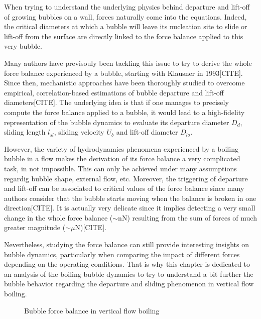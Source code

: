 When trying to understand the underlying physics behind departure and lift-off of growing bubbles on a wall, forces naturally come into the equations. Indeed, the critical diameters at which a bubble will leave its nucleation site to slide or lift-off from the surface are directly linked to the force balance applied to this very bubble.

\npar

Many authors have previsouly been tackling this issue to try to derive the whole force balance experienced by a bubble, starting with Klausner in 1993[CITE]. Since then, mechanistic approaches have been thoroughly studied to overcome empirical, correlation-based estimations of bubble departure and lift-off diameters[CITE]. The underlying idea is that if one manages to precisely compute the force balance applied to a bubble, it would lead to a high-fidelity representation of the bubble dynamics to evaluate its departure diameter $D_{d}$, sliding length $l_{sl}$, sliding velocity $U_{b}$ and lift-off diameter $D_{lo}$.  

\npar

However, the variety of hydrodynamics phenomena experienced by a boiling bubble in a flow makes the derivation of its force balance a very complicated task, in not impossible. This can only be achieved under many assumptions regardig bubble shape, external flow, etc. Moreover, the triggering of departure and lift-off can be associated to critical values of the force balance since many authors consider that the bubble starts moving when the balance is broken in one direction[CITE]. It is actually very delicate since it implies detecting a very small change in the whole force balance ($\sim \mathrm{nN}$) resulting from the sum of forces of much greater magnitude ($\sim \mu\mathrm{N}$)[CITE].

\npar

Nevertheless, studying the force balance can still provide interesting insights on bubble dynamics, particularly when comparing the impact of different forces depending on the operating conditions. That is why this chapter is dedicated to an analysis of the boiling bubble dynamics to try to understand a bit further the bubble behavior regarding the departure and sliding phenomenon in vertical flow boiling.



\begin{figure}[h!]
\centering

\caption{Bubble force balance in vertical flow boiling}
\end{figure}


